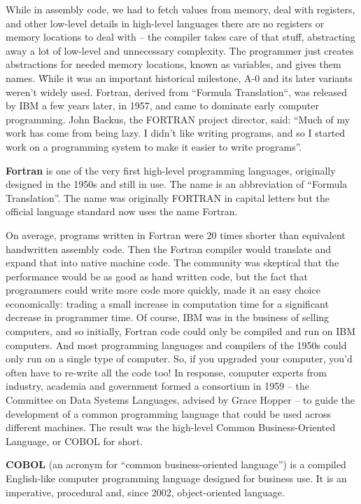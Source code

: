 While in assembly code, we had to fetch values from memory, deal with registers, and other low-level details in
high-level languages there are no registers or memory locations to deal with -- the compiler takes care of that
stuff, abstracting away a lot of low-level and unnecessary complexity. The programmer just creates abstractions for
needed memory locations,  known as variables, and gives them names. \v

While it was an important historical milestone, A-0 and its later variants weren't widely used. Fortran, derived from
``Formula Translation``, was released by IBM a few years later, in 1957, and came to dominate early computer
programming. John Backus, the FORTRAN project director, said: ``Much of my work has come from being lazy. I didn't
like writing programs, and so I started work on a programming system to make it easier to write programs''.

\bd[Fortran]
\textbf{Fortran} is one of the very first high-level programming languages, originally designed in the 1950s and
still in use. The name is an abbreviation of ``Formula Translation''. The name was originally FORTRAN in capital
letters but the official language standard now uses the name Fortran.
\ed

On average, programs written in Fortran were 20 times shorter than equivalent handwritten assembly code. Then the
Fortran compiler would translate and expand that into native machine code. The community was skeptical that the
performance would be as good as hand written code, but the fact that programmers could write more code more quickly,
made it an easy choice economically: trading a small increase in computation time for a significant decrease in
programmer time. Of course, IBM was in the business of selling computers, and so initially, Fortran code could only
be compiled and run on IBM computers. And most programming languages and compilers of the 1950s could only run on a
single type of computer. So, if you upgraded your computer, you'd often have to re-write all the code too! In
response, computer experts from industry, academia and government formed a consortium in 1959 -- the Committee on
Data Systems Languages, advised by Grace Hopper -- to guide the development of a common programming language that
could be used across different machines. The result was the high-level Common Business-Oriented Language, or COBOL
for short.

\bd[COBOL]
\textbf{COBOL} (an acronym for ``common business-oriented language'') is a compiled English-like computer programming
language designed for business use. It is an imperative, procedural and, since 2002, object-oriented language.
\ed


